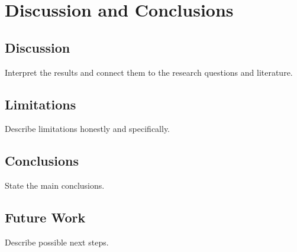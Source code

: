 \chapter{Discussion and Conclusions}
\label{ch:discussion-conclusions}

\section{Discussion}
\label{sec:discussion}

Interpret the results and connect them to the research questions and literature.

\section{Limitations}
\label{sec:limitations}

Describe limitations honestly and specifically.

\section{Conclusions}
\label{sec:conclusions}

State the main conclusions.

\section{Future Work}
\label{sec:future-work}

Describe possible next steps.
